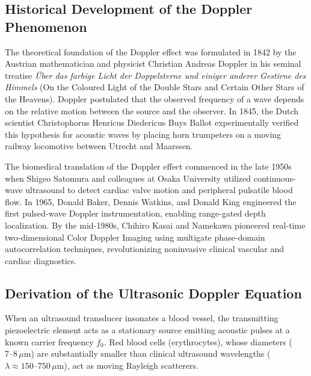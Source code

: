 \documentclass[11pt,a4paper]{article}
\begin{document}
\subsection{Historical Development of the Doppler Phenomenon}

The theoretical foundation of the Doppler effect was formulated in 1842 by the Austrian mathematician and physicist Christian Andreas Doppler in his seminal treatise \textit{Über das farbige Licht der Doppelsterne und einiger anderer Gestirne des Himmels} (On the Coloured Light of the Double Stars and Certain Other Stars of the Heavens). Doppler postulated that the observed frequency of a wave depends on the relative motion between the source and the observer. In 1845, the Dutch scientist Christophorus Henricus Diedericus Buys Ballot experimentally verified this hypothesis for acoustic waves by placing horn trumpeters on a moving railway locomotive between Utrecht and Maarssen.

The biomedical translation of the Doppler effect commenced in the late 1950s when Shigeo Satomura and colleagues at Osaka University utilized continuous-wave ultrasound to detect cardiac valve motion and peripheral pulsatile blood flow. In 1965, Donald Baker, Dennis Watkins, and Donald King engineered the first pulsed-wave Doppler instrumentation, enabling range-gated depth localization. By the mid-1980s, Chihiro Kasai and Namekawa pioneered real-time two-dimensional Color Doppler Imaging using multigate phase-domain autocorrelation techniques, revolutionizing noninvasive clinical vascular and cardiac diagnostics.

\subsection{Derivation of the Ultrasonic Doppler Equation}

When an ultrasound transducer insonates a blood vessel, the transmitting piezoelectric element acts as a stationary source emitting acoustic pulses at a known carrier frequency $f_0$. Red blood cells (erythrocytes), whose diameters ($7\text{--}8\,\mu\text{m}$) are substantially smaller than clinical ultrasound wavelengths ($\lambda \approx 150\text{--}750\,\mu\text{m}$), act as moving Rayleigh scatterers. 
\end{document}
